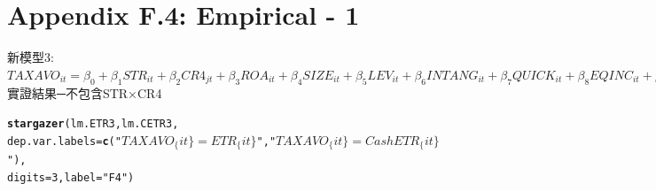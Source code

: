 \documentclass[a4paper]{article}\usepackage[]{graphicx}\usepackage[]{color}
\makeatletter
\newcommand{\hlnum}[1]{\textcolor[rgb]{0.686,0.059,0.569}{#1}}%
\newcommand{\hlstr}[1]{\textcolor[rgb]{0.192,0.494,0.8}{#1}}%
\newcommand{\hlstd}[1]{\textcolor[rgb]{0.345,0.345,0.345}{#1}}%
\newcommand{\hlkwc}[1]{\textcolor[rgb]{0.333,0.667,0.333}{#1}}%
\newcommand{\hlkwd}[1]{\textcolor[rgb]{0.737,0.353,0.396}{\textbf{#1}}}%
\newenvironment{kframe}{%
 \def\at@end@of@kframe{}%
 \ifinner\ifhmode%
  \def\at@end@of@kframe{\end{minipage}}%
  \begin{minipage}{\columnwidth}%
 \fi\fi%
 \def\FrameCommand##1{\hskip\@totalleftmargin \hskip-\fboxsep
 \colorbox{shadecolor}{##1}\hskip-\fboxsep
     \hskip-\linewidth \hskip-\@totalleftmargin \hskip\columnwidth}%
 \MakeFramed {\advance\hsize-\width
   \@totalleftmargin\z@ \linewidth\hsize
   \@setminipage}}%
 {\par\unskip\endMakeFramed%
 \at@end@of@kframe}
\makeatother
\begin{document}
\newpage
\section{\\Appendix F.4: Empirical - 1} \label{App:Appendix F.4}
新模型3:\\
$TAXAVO_{it}=\beta_{0}+\beta_{1}STR_{it}+\beta_{2}CR4_{jt}+\beta_{3}ROA_{it}+\beta_{4}SIZE_{it}+\beta_{5}LEV_{it}+\beta_{6}INTANG_{it}+\beta_{7}QUICK_{it}+\beta_{8}EQINC_{it}+\beta_{9}OUTINSTI_{it}+\beta_{10}RELAT_{it}+\beta_{11}FAMILY_{it}+\beta_{12}GDP_{it}+\varepsilon_{13}$\\
實證結果─不包含STR×CR4\\
\begin{kframe}
\begin{alltt}
  \hlkwd{stargazer}\hlstd{(lm.ETR3,lm.CETR3,}
    \hlkwc{dep.var.labels} \hlstd{=} \hlkwd{c}\hlstd{(}\hlstr{"$TAXAVO_\{it\}=ETR_\{it\}$"}\hlstd{,}\hlstr{"$TAXAVO_\{it\}=CashETR_\{it\}$"}\hlstd{),}
    \hlkwc{digits}\hlstd{=}\hlnum{3}\hlstd{,}\hlkwc{label} \hlstd{=} \hlstr{"F4"}\hlstd{)}
\end{alltt}
\end{kframe}
\end{document}
